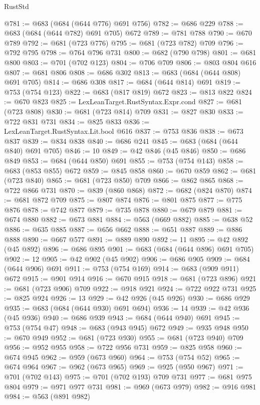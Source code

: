 \begin{lexlean}{RustStd}
\begin{coremodule}
@781 := @683 (@684 (@644 @776) @691 @756)
@782 := @686 @229
@788 := @683 (@684 (@644 @782) @691 @705) @672
@789 := @781 @788
@790 := @670 @789
@792 := @681 (@723 @776)
@795 := @681 (@723 @782) @709
@796 := @792 @795
@798 := @764 @796 @731
@800 := @682 (@790 @798)
@801 := @681 @800
@803 := @701 (@702 @123)
@804 := @706 @709
@806 := @803 @804 @616
@807 := @681 @806
@808 := @686 @302
@813 := @683 (@684 (@644 @808) @691 @705)
@814 := @686 @308
@817 := @684 (@644 @814) @691
@819 := @753 (@754 @123)
@822 := @683 (@817 @819) @672
@823 := @813 @822
@824 := @670 @823
@825 := LexLeanTarget.RustSyntax.Expr.cond
@827 := @681 (@723 @808)
@830 := @681 (@723 @814) @709
@831 := @827 @830
@833 := @722 @831 @731
@834 := @825 @833
@836 := LexLeanTarget.RustSyntax.Lit.bool @616
@837 := @753 @836
@838 := @673 @837
@839 := @834 @838
@840 := @686 @241
@845 := @683 (@684 (@644 @840) @691 @705)
@846 := 10
@849 := @42 @846 (@45 @846)
@850 := @686 @849
@853 := @684 (@644 @850) @691
@855 := @753 (@754 @143)
@858 := @683 (@853 @855) @672
@859 := @845 @858
@860 := @670 @859
@862 := @681 (@723 @840)
@865 := @681 (@723 @850) @709
@866 := @862 @865
@868 := @722 @866 @731
@870 := @839 (@860 @868)
@872 := @682 (@824 @870)
@874 := @681 @872 @709
@875 := @807 @874
@876 := @801 @875
@877 := @775 @876
@878 := @742 @877
@879 := @735 @878
@880 := @679 @879
@881 := @674 @880
@882 := @673 @881
@884 := @563 (@669 @882)
@885 := @638 @52
@886 := @635 @885
@887 := @656 @662
@888 := @651 @887
@889 := @886 @888
@890 := @667 @577
@891 := @889 @890
@892 := 11
@895 := @42 @892 (@45 @892)
@896 := @686 @895
@901 := @683 (@684 (@644 @896) @691 @705)
@902 := 12
@905 := @42 @902 (@45 @902)
@906 := @686 @905
@909 := @684 (@644 @906) @691
@911 := @753 (@754 @169)
@914 := @683 (@909 @911) @672
@915 := @901 @914
@916 := @670 @915
@918 := @681 (@723 @896)
@921 := @681 (@723 @906) @709
@922 := @918 @921
@924 := @722 @922 @731
@925 := @825 @924
@926 := 13
@929 := @42 @926 (@45 @926)
@930 := @686 @929
@935 := @683 (@684 (@644 @930) @691 @694)
@936 := 14
@939 := @42 @936 (@45 @936)
@940 := @686 @939
@943 := @684 (@644 @940) @691
@945 := @753 (@754 @47)
@948 := @683 (@943 @945) @672
@949 := @935 @948
@950 := @670 @949
@952 := @681 (@723 @930)
@955 := @681 (@723 @940) @709
@956 := @952 @955
@958 := @722 @956 @731
@959 := @825 @958
@960 := @674 @945
@962 := @959 (@673 @960)
@964 := @753 (@754 @52)
@965 := @674 @964
@967 := @962 (@673 @965)
@969 := @925 (@950 @967)
@971 := @701 (@702 @143)
@975 := @701 (@702 @193) @709 @731
@977 := @681 @975 @804
@979 := @971 @977 @731
@981 := @969 (@673 @979)
@982 := @916 @981
@984 := @563 (@891 @982)

\end{coremodule}
\end{lexlean}
